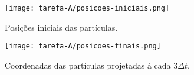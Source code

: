 


\begin{figure}[h!]
    \centering
    \texttt{[image: tarefa-A/posicoes-iniciais.png]}
    \caption{Posições iniciais das partículas.}
    \label{eq:tarefa_a_posicoes_iniciais}
\end{figure}

\begin{figure}[h!]
    \centering 
    \texttt{[image: tarefa-A/posicoes-finais.png]}
    \caption{Coordenadas das partículas projetadas à cada $3 \Delta t$.}
\end{figure}




